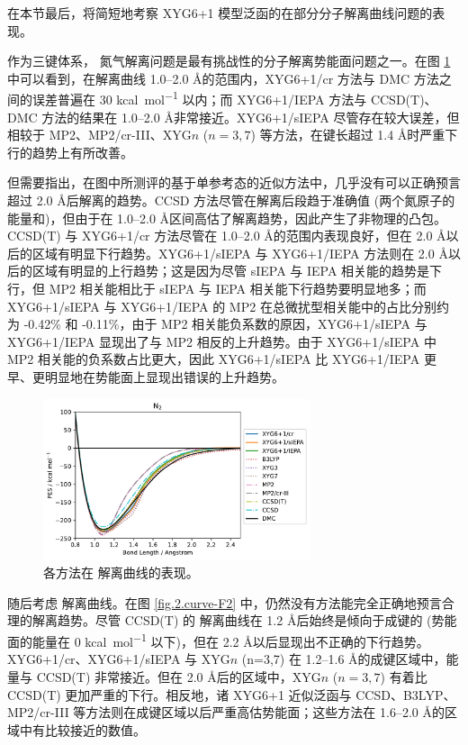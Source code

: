 在本节最后，将简短地考察 XYG6+1 模型泛函的在部分分子解离曲线问题的表现。

作为三键体系， 氮气解离问题是最有挑战性的分子解离势能面问题之一。在图 \ref{fig.2.curve-N2} 中可以看到，在解离曲线 1.0--2.0 \AA 的范围内，XYG6+1/cr 方法与 DMC 方法之间的误差普遍在 30 \si{kcal.mol^{-1}} 以内；而 XYG6+1/IEPA 方法与 CCSD(T)、DMC 方法的结果在 1.0--2.0 \AA 非常接近。XYG6+1/sIEPA 尽管存在较大误差，但相较于 MP2、MP2/cr-III、XYG$n$ ($n=3,7$) 等方法，在键长超过 1.4 \AA 时严重下行的趋势上有所改善。

但需要指出，在图中所测评的基于单参考态的近似方法中，几乎没有可以正确预言超过 2.0 \AA 后解离的趋势。CCSD 方法尽管在解离后段趋于准确值 (两个氮原子的能量和)，但由于在 1.0--2.0 \AA 区间高估了解离趋势，因此产生了非物理的凸包。CCSD(T) 与 XYG6+1/cr 方法尽管在 1.0--2.0 \AA 的范围内表现良好，但在 2.0 \AA 以后的区域有明显下行趋势。XYG6+1/sIEPA 与 XYG6+1/IEPA 方法则在 2.0 \AA 以后的区域有明显的上行趋势；这是因为尽管 sIEPA 与 IEPA 相关能的趋势是下行，但 MP2 相关能相比于 sIEPA 与 IEPA 相关能下行趋势要明显地多；而 XYG6+1/sIEPA 与 XYG6+1/IEPA 的 MP2 在总微扰型相关能中的占比分别约为 -0.42\% 和 -0.11\%，由于 MP2 相关能负系数的原因，XYG6+1/sIEPA 与 XYG6+1/IEPA 显现出了与 MP2 相反的上升趋势。由于 XYG6+1/sIEPA 中 MP2 相关能的负系数占比更大，因此 XYG6+1/sIEPA 比 XYG6+1/IEPA 更早、更明显地在势能面上显现出错误的上升趋势。

\begin{figure}[h]
  \centering
  \includegraphics[width=0.7\textwidth]{assets/curve-N2.pdf}
  \caption[ 解离曲线表现]{各方法在  解离曲线的表现。}
  \label{fig.2.curve-N2}
\end{figure}

随后考虑  解离曲线。在图 \ref{fig.2.curve-F2} 中，仍然没有方法能完全正确地预言合理的解离趋势。尽管 CCSD(T) 的  解离曲线在 1.2 \AA 后始终是倾向于成键的 (势能面的能量在 0 \si{kcal.mol^{-1}} 以下)，但在 2.2 \AA 以后显现出不正确的下行趋势。XYG6+1/cr、XYG6+1/sIEPA 与 XYG$n$ (n=3,7) 在 1.2--1.6 \AA 的成键区域中，能量与 CCSD(T) 非常接近。但在 2.0 \AA 后的区域中，XYG$n$ ($n=3,7$) 有着比 CCSD(T) 更加严重的下行。相反地，诸 XYG6+1 近似泛函与 CCSD、B3LYP、MP2/cr-III 等方法则在成键区域以后严重高估势能面；这些方法在 1.6--2.0 \AA 的区域中有比较接近的数值。

